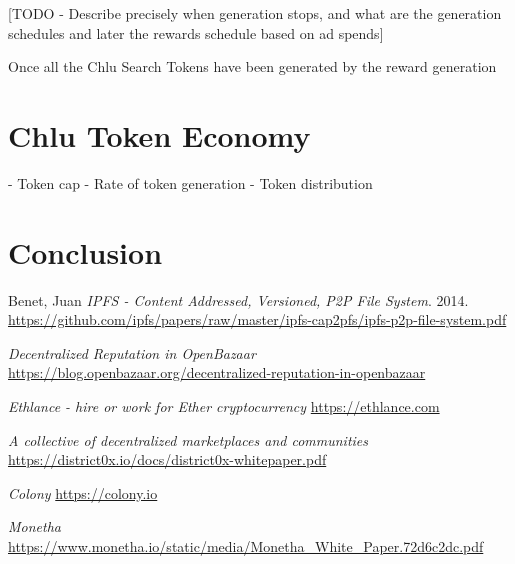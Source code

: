 \documentclass[a4paper]{article}
\begin{document}
[TODO - Describe precisely when generation stops, and what are the
  generation schedules and later the rewards schedule based on ad spends]

Once all the Chlu Search Tokens have been generated by the reward generation

\section{Chlu Token Economy}

- Token cap
- Rate of token generation
- Token distribution


\section{Conclusion}


\medskip
 
\begin{thebibliography}{9}

  Benet, Juan
  \textit{IPFS - Content Addressed, Versioned, P2P File System}. 2014.
  \url{https://github.com/ipfs/papers/raw/master/ipfs-cap2pfs/ipfs-p2p-file-system.pdf}

  \textit{Decentralized Reputation in OpenBazaar}
  \newline
  \url{https://blog.openbazaar.org/decentralized-reputation-in-openbazaar}

  \textit{Ethlance - hire or work for Ether cryptocurrency}
  \url{https://ethlance.com}

  \textit{A collective of decentralized marketplaces and communities}
  \url{https://district0x.io/docs/district0x-whitepaper.pdf}

  \textit{Colony}
  \url{https://colony.io}

  \textit{Monetha}
  \url{https://www.monetha.io/static/media/Monetha_White_Paper.72d6c2dc.pdf}
  
\end{thebibliography}
\end{document}
